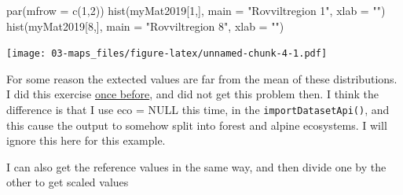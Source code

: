 \documentclass[
]{book}
\newenvironment{Shaded}{\begin{snugshade}}{\end{snugshade}}
\newcommand{\AttributeTok}[1]{\textcolor[rgb]{0.77,0.63,0.00}{#1}}
\newcommand{\DecValTok}[1]{\textcolor[rgb]{0.00,0.00,0.81}{#1}}
\newcommand{\FunctionTok}[1]{\textcolor[rgb]{0.00,0.00,0.00}{#1}}
\newcommand{\NormalTok}[1]{#1}
\newcommand{\OtherTok}[1]{\textcolor[rgb]{0.56,0.35,0.01}{#1}}
\newcommand{\SpecialCharTok}[1]{\textcolor[rgb]{0.00,0.00,0.00}{#1}}
\newcommand{\StringTok}[1]{\textcolor[rgb]{0.31,0.60,0.02}{#1}}
\begin{document}
\begin{Shaded}
\begin{Highlighting}[]
\FunctionTok{par}\NormalTok{(}\AttributeTok{mfrow =} \FunctionTok{c}\NormalTok{(}\DecValTok{1}\NormalTok{,}\DecValTok{2}\NormalTok{))}
\FunctionTok{hist}\NormalTok{(myMat2019[}\DecValTok{1}\NormalTok{,], }\AttributeTok{main =} \StringTok{"Rovviltregion 1"}\NormalTok{, }\AttributeTok{xlab =} \StringTok{""}\NormalTok{)}
\FunctionTok{hist}\NormalTok{(myMat2019[}\DecValTok{8}\NormalTok{,], }\AttributeTok{main =} \StringTok{"Rovviltregion 8"}\NormalTok{, }\AttributeTok{xlab =} \StringTok{""}\NormalTok{)}
\end{Highlighting}
\end{Shaded}

\texttt{[image: 03-maps\_files/figure-latex/unnamed-chunk-4-1.pdf]}

For some reason the extected values are far from the mean of these distributions. I did this exercise \href{https://ninanor.github.io/IBECA/jerv.html}{once before}, and did not get this problem then. I think the difference is that I use eco = NULL this time, in the \texttt{importDatasetApi()}, and this cause the output to somehow split into forest and alpine ecosystems. I will ignore this here for this example.

I can also get the reference values in the same way, and then divide one by the other to get scaled values

\begin{Shaded}
\end{Shaded}
\end{document}
